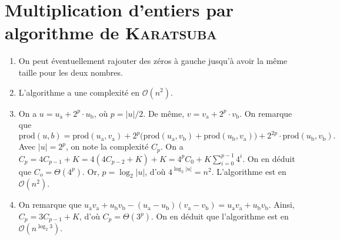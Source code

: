 \section{Multiplication d'entiers par algorithme de \textsc{Karatsuba}}

\begin{enumerate}
	\item On peut éventuellement rajouter des zéros à gauche jusqu'à avoir la même taille pour les deux nombres.
	\item L'algorithme a une complexité en $\mathcal{O}(n^2)$.
	\item On a $u = u_\mathrm{a} + 2^p \cdot u_\mathrm{b}$, où $p = |u| / 2$.
		De même, $v = v_\mathrm{a} + 2^p \cdot v_\mathrm{b}$.
		On remarque que \[
			\mathrm{prod}(u, b) = \mathrm{prod}(u_\mathrm{a}, v_\mathrm{a}) + 2^p \big(\mathrm{prod}(u_\mathrm{a}, v_\mathrm{b}) + \mathrm{prod}(u_\mathrm{b}, v_\mathrm{a})\big) + 2^{2p} \cdot \mathrm{prod}(u_\mathrm{b}, v_\mathrm{b}).
		\]
		Avec $|u| = 2^p$, on note la complexité $C_p$. On a $C_p = 4 C_{p-1} + K = 4(4 C_{p-2} + K) + K = 4^p C_0 + K \sum_{i=0}^{p-1} 4^i$.
		On en déduit que $C_o = \Theta(4^p)$. Or, $p = \log_2 |u|$, d'où $4^{\log_2 |u|} = n^2$.
		L'algorithme est en $\mathcal{O}(n^2)$.
	\item On remarque que $u_\mathrm{a} v_\mathrm{a} + u_\mathrm{b} v_\mathrm{b} - (u_\mathrm{a} - u_\mathrm{b})(v_\mathrm{a} - v_\mathrm{b}) = u_\mathrm{a}v_\mathrm{a} + u_\mathrm{b} v_\mathrm{b}$.
		Ainsi, $C_p = 3 C_{p-1} + K$, d'où $C_p = \Theta(3^p)$.
		On en déduit que l'algorithme est en $\mathcal{O}(n^{\log_2 3})$.
\end{enumerate}
